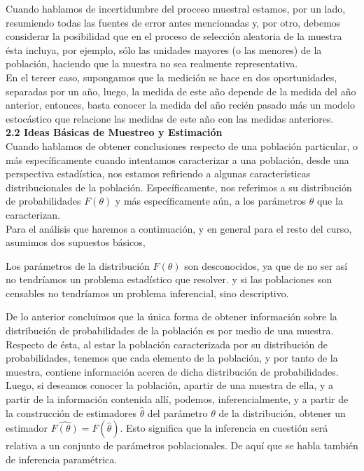 \documentclass[base=hide,11pt]{elegantbook}
\begin{document}
Cuando hablamos de incertidumbre del proceso muestral estamos, por un lado, resumiendo todas las fuentes de error antes mencionadas y, por otro, debemos considerar la posibilidad que en el proceso de selección aleatoria de la muestra ésta incluya, por ejemplo, sólo las unidades mayores (o las menores) de la población, haciendo que la muestra no sea realmente representativa.\\
	
En el tercer caso, supongamos que la medición se hace en dos oportunidades, separadas por un año, luego, la medida de este año depende de la medida del año anterior, entonces, basta conocer la medida del año recién pasado más un modelo estocástico que relacione las medidas de este año con las medidas anteriores.\\
	
\textcolor{col4}{\bf \large 2.2 Ideas Básicas de Muestreo y Estimación}\\
Cuando hablamos de obtener conclusiones respecto de una población particular, o más específicamente cuando intentamos caracterizar a una población, desde una perspectiva estadística,  nos estamos refiriendo a algunas características distribucionales de la población. Específicamente, nos referimos a su distribución de probabilidades $F(\theta)$ y más específicamente aún,  a los parámetros $\theta$ que la caracterizan.\\
	
Para el análisis que haremos a continuación, y en general para el resto del curso, asumimos dos supuestos básicos,
	

Los parámetros de la distribución $F(\theta)$ son desconocidos, ya que de no ser así no tendríamos un problema estadístico que resolver.
 y si las poblaciones son  censables  no tendríamos un problema inferencial, sino descriptivo.

	
De lo anterior concluimos que la única forma de obtener información sobre la distribución de probabilidades de la población es por medio de una muestra. Respecto de ésta, al estar la población caracterizada por su distribución de probabilidades, tenemos que cada elemento de la población, y por tanto de la muestra, contiene información acerca de dicha distribución de probabilidades. Luego, si deseamos conocer la población, apartir de una muestra de ella, y a partir de la información contenida allí, podemos, inferencialmente, y a partir de la construcción de estimadores $\widehat{\theta}$  del parámetro $\theta$ de la distribución, obtener un estimador $\widehat{F(\theta)} = F( \widehat{\theta})$. Esto significa que la inferencia en cuestión será relativa a un conjunto de parámetros poblacionales. De aquí que se habla también de inferencia paramétrica.\\
	
\end{document}
